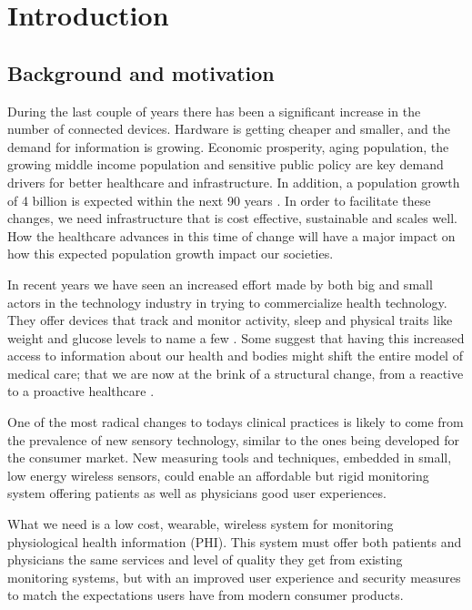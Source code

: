 \section{Introduction} 

\label{sec:introduction}

\subsection{Background and motivation} 

\label{sub:background_and_motivation}

During the last couple of years there has been a significant increase in the number of connected devices. Hardware is getting cheaper and smaller, and the demand for information is growing. Economic prosperity, aging population, the growing middle income population and sensitive public policy are key demand drivers for better healthcare and infrastructure. In addition, a population growth of 4 billion is expected within the next 90 years \cite{WPP2015_Methodology}. In order to facilitate these changes, we need infrastructure that is cost effective, sustainable and scales well. How the healthcare advances in this time of change will have a major impact on how this expected population growth impact our societies. 

In recent years we have seen an increased effort made by both big and small actors in the technology industry in trying to commercialize health technology. They offer devices that track and monitor activity, sleep and physical traits like weight and glucose levels to name a few \cite{fitbit, fitbit_scale_6}. Some suggest that having this increased access to information about our health and bodies might shift the entire model of medical care; that we are now at the brink of a structural change, from a reactive to a proactive healthcare \cite{lynnechou_7, helsit_kari_8, johnmaeda_9, deloitte_healthcare3_0_10}.

One of the most radical changes to todays clinical practices is likely to come from the prevalence of new sensory technology, similar to the ones being developed for the consumer market. New measuring tools and techniques, embedded in small, low energy wireless sensors, could enable an affordable but rigid monitoring system offering patients as well as physicians good user experiences. 

What we need is a low cost, wearable, wireless system for monitoring physiological health information (PHI). This system must offer both patients and physicians the same services and level of quality they get from existing monitoring systems, but with an improved user experience and security measures to match the expectations users have from modern consumer products. 

